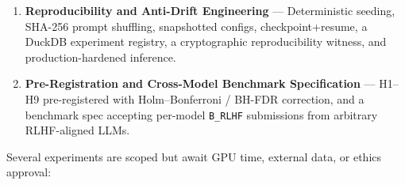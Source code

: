 \begin{enumerate}
\item \textbf{Reproducibility and Anti-Drift Engineering} — Deterministic seeding, SHA-256 prompt shuffling, snapshotted configs, checkpoint+resume, a DuckDB experiment registry, a cryptographic reproducibility witness, and production-hardened inference.
\item \textbf{Pre-Registration and Cross-Model Benchmark Specification} — H1–H9 pre-registered with Holm–Bonferroni / BH-FDR correction, and a benchmark spec accepting per-model \texttt{B\_RLHF} submissions from arbitrary RLHF-aligned LLMs.
\end{enumerate}


Several experiments are scoped but await GPU time, external data, or ethics approval:

